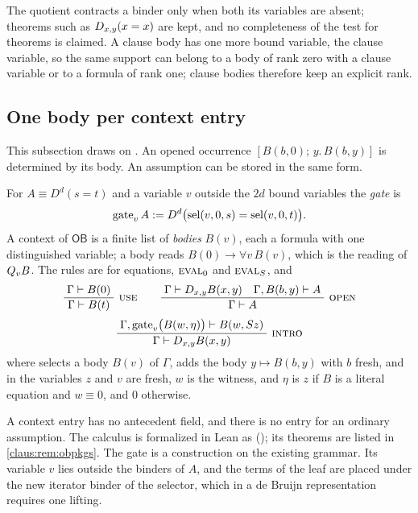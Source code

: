 The quotient contracts a binder only when both its variables are absent;
theorems such as $D_{x,y}(x=x)$ are kept, and no completeness of the test
for theorems is claimed. A clause body has one more bound variable, the
clause variable, so the same support can belong to a body of rank zero
with a clause variable or to a formula of rank one; clause bodies therefore
keep an explicit rank.

\subsection{One body per context entry}
\label{claus:sec:onebody}

This subsection draws on . An opened occurrence
$[B(b,0);\,y.\,B(b,y)]$ is determined by its body. An assumption can be
stored in the same form.

\begin{definition}
\label{claus:def:ob}
For $A\equiv D^d(s=t)$ and a variable $v$ outside the $2d$ bound variables
the \emph{gate} is
\[
 \operatorname{gate}_vA\mathrel{:=}
 D^d\bigl(\operatorname{sel}(v,0,s)=\operatorname{sel}(v,0,t)\bigr).
\]
A context of $\mathsf{OB}$ is a finite list of \emph{bodies} $B(v)$, each
a formula with one distinguished variable; a body reads
$B(0)\to\forall v\,B(v)$, which is the reading of $Q_{v}B$. The rules are
 for equations, $\rulename{Eval}_0$ and
$\rulename{Eval}_{\Suc}$, and
\[
 \infrule{\Gamma\proves B(0)}{\Gamma\proves B(t)}\ \rulename{Use}
 \qquad
 \infrule{\Gamma\proves\D{x}{y}B(x,y)\quad\Gamma,B(b,y)\proves A}
         {\Gamma\proves A}\ \rulename{Open}
\]
\[
 \infrule{\Gamma,\operatorname{gate}_v\bigl(B(w,\eta)\bigr)\proves
          B(w,\Suc z)}
         {\Gamma\proves\D{x}{y}B(x,y)}\ \rulename{Intro}
\]
where  selects a body $B(v)$ of $\Gamma$, 
adds the body $y\mapsto B(b,y)$ with $b$ fresh, and in 
the variables $z$ and $v$ are fresh, $w$ is the witness, and $\eta$ is $z$
if $B$ is a literal equation and $w\equiv 0$, and $0$ otherwise.
\end{definition}

A context entry has no antecedent field, and there is no entry for an
ordinary assumption. The calculus is formalized in Lean as 
(); its theorems are listed in
\cref{claus:rem:obpkgs}. The gate is a construction on the existing grammar.
Its variable $v$ lies outside the binders of $A$, and the terms of the
leaf are placed under the new iterator binder of the selector, which in a
de Bruijn representation requires one lifting.

